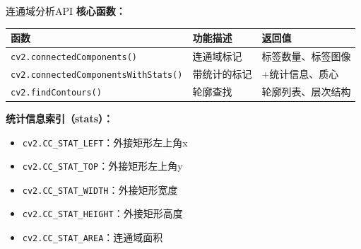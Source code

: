 \begin{frame}{连通域分析API}
    \textbf{核心函数：}

    \begin{table}
        \centering
        \small
        \begin{tabular}{lp{4cm}l}
        \toprule
        函数 & 功能描述 & 返回值 \\
        \midrule
        \texttt{cv2.connectedComponents()} & 连通域标记 & 标签数量、标签图像 \\
        \texttt{cv2.connectedComponentsWithStats()} & 带统计的标记 & +统计信息、质心 \\
        \texttt{cv2.findContours()} & 轮廓查找 & 轮廓列表、层次结构 \\
        \bottomrule
        \end{tabular}
    \end{table}

    \vspace{0.3cm}

    \textbf{统计信息索引（stats）：}
    \begin{itemize}
        \item \texttt{cv2.CC\_STAT\_LEFT}：外接矩形左上角x
        \item \texttt{cv2.CC\_STAT\_TOP}：外接矩形左上角y
        \item \texttt{cv2.CC\_STAT\_WIDTH}：外接矩形宽度
        \item \texttt{cv2.CC\_STAT\_HEIGHT}：外接矩形高度
        \item \texttt{cv2.CC\_STAT\_AREA}：连通域面积
    \end{itemize}
\end{frame}

